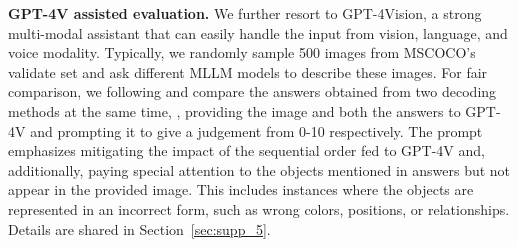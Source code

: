 \documentclass[10pt,twocolumn,letterpaper]{article}
\newcommand{\Sref}[1]{Section~\ref{#1}}
\begin{document}
\begin{table}[t]
\vspace{-0.5em}
    \footnotesize
    \centering
    \vspace{-0.5em}
    \caption{POPE hallucination evaluation results on four MLLM models. We report the average F1-score computed on \textit{random}, \textit{popular}, and \textit{adversarial} splits of POPE.}
    \label{tab:pope_f1}
\end{table}




































\noindent\textbf{GPT-4V assisted evaluation.} 
We further resort to GPT-4Vision, a strong multi-modal assistant that can easily handle the input from vision, language, and voice modality. 
Typically, we randomly sample 500 images from MSCOCO's validate set and ask different MLLM models to describe these images. 
For fair comparison, we following \cite{yin2023woodpecker} and compare the answers obtained from two decoding methods at the same time, \ie, providing the image and both the answers to GPT-4V and prompting it to give a judgement from 0-10 respectively. 
The prompt emphasizes mitigating the impact of the sequential order fed to GPT-4V and, additionally, paying special attention to the objects mentioned in answers but not appear in the provided image. 
This includes instances where the objects are represented in an incorrect form, such as wrong colors, positions, or relationships.
Details are shared in \Sref{sec:supp_5}.
\end{document}
